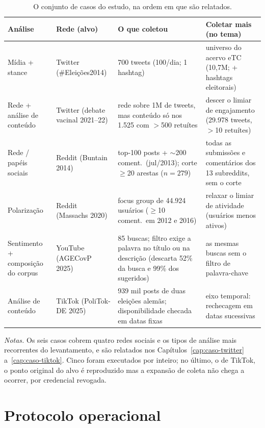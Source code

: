 \begin{table}[htbp]
\centering\footnotesize
\caption[O conjunto de casos do estudo]{O conjunto de casos do estudo, na ordem em que
são relatados.}
\label{tab:casos}
\begin{tabularx}{\textwidth}{@{}>{\raggedright\arraybackslash}p{2.1cm}>{\raggedright\arraybackslash}p{2.4cm}XX@{}}
\toprule
Análise & Rede (alvo) & O que coletou & Coletar mais (no tema) \\
\midrule
Mídia + stance & Twitter (\#Eleições2014) & 700 tweets (100/dia; 1 hashtag) & universo do acervo eTC (10,7M; + hashtags eleitorais) \\
\addlinespace[2pt]
Rede + análise de conteúdo & Twitter (debate vacinal 2021--22) & rede sobre 1M de tweets, mas conteúdo só nos 1.525 com $>$500 retuítes & descer o limiar de engajamento (29.978 tweets, $>$10 retuítes) \\
\addlinespace[2pt]
Rede / papéis sociais & Reddit (Buntain 2014) & top-100 posts + $\sim$200 coment.\ (jul/2013); corte $\geq$20 arestas ($n{=}279$) & todas as submissões e comentários dos 13 subreddits, sem o corte \\
\addlinespace[2pt]
Polarização & Reddit (Massachs 2020) & focus group de 44.924 usuários ($\geq$10 coment.\ em 2012 e 2016) & relaxar o limiar de atividade (usuários menos ativos) \\
\addlinespace[2pt]
Sentimento + composição do corpus & YouTube (AGECovP 2025) & 85 buscas; filtro exige a palavra no título ou na descrição (descarta 52\% da busca e 99\% dos sugeridos) & as mesmas buscas sem o filtro de palavra-chave \\
\addlinespace[2pt]
Análise de conteúdo & TikTok (PoliTok-DE 2025) & 939 mil posts de duas eleições alemãs; disponibilidade checada em datas fixas & eixo temporal: rechecagem em datas sucessivas \\
\bottomrule
\end{tabularx}

\vspace{2pt}
{\footnotesize \textit{Notas.} Os seis casos cobrem quatro redes sociais e os tipos de
análise mais recorrentes do levantamento, e são relatados nos
Capítulos~\ref{cap:caso-twitter} a~\ref{cap:caso-tiktok}. Cinco foram executados por
inteiro; no último, o de TikTok, o ponto original do alvo é reproduzido mas a expansão
de coleta não chega a ocorrer, por credencial revogada.\par}
\end{table}

\section{Protocolo operacional}
\label{sec:protocolo-operacional}

